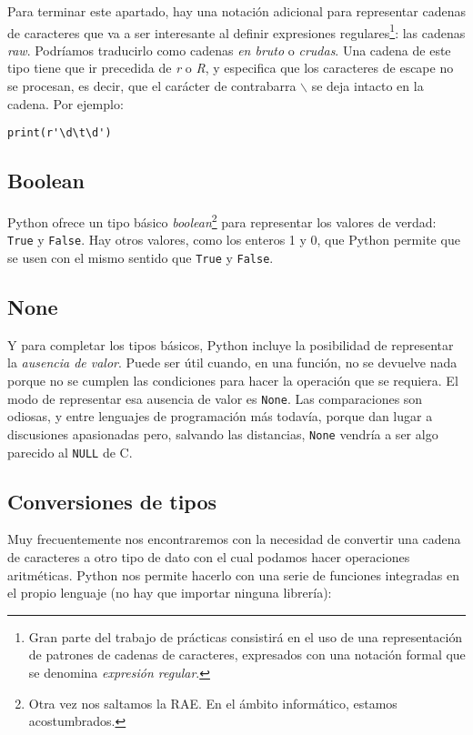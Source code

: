 Para terminar este apartado, hay una notación adicional para representar cadenas de caracteres que va a ser interesante al definir expresiones regulares\footnote{Gran parte del trabajo de prácticas consistirá en el uso de una representación de patrones de cadenas de caracteres, expresados con una notación formal que se denomina \emph{expresión regular}.}: las cadenas \emph{raw}. Podríamos traducirlo como cadenas \emph{en bruto} o \emph{crudas}. Una cadena de este tipo tiene que ir precedida de \emph{r} o \emph{R}, y especifica que los caracteres de escape no se procesan, es decir, que el carácter de contrabarra $\backslash$ se deja intacto en la cadena. Por ejemplo:

\begin{lstlisting}
print(r'\d\t\d')
\end{lstlisting}


\subsection{Boolean}

Python ofrece un tipo básico \emph{boolean}\footnote{Otra vez nos saltamos la RAE. En el ámbito informático, estamos acostumbrados.} para representar los valores de verdad: \texttt{True} y \texttt{False}. Hay otros valores, como los enteros 1 y 0, que Python permite que se usen con el mismo sentido que \texttt{True} y \texttt{False}. 

\subsection{None}

Y para completar los tipos básicos, Python incluye la posibilidad de representar la \emph{ausencia de valor}. Puede ser útil cuando, en una función, no se devuelve nada porque no se cumplen las condiciones para hacer la operación que se requiera. El modo de representar esa ausencia de valor es \texttt{None}. Las comparaciones son odiosas, y entre lenguajes de programación más todavía, porque dan lugar a discusiones apasionadas pero, salvando las distancias, \texttt{None} vendría a ser algo parecido al \texttt{NULL} de C.

\subsection{Conversiones de tipos}

Muy frecuentemente nos encontraremos con la necesidad de convertir una cadena de caracteres a otro tipo de dato con el cual podamos hacer operaciones aritméticas. Python nos permite hacerlo con una serie de funciones integradas en el propio lenguaje (no hay que importar ninguna librería):

